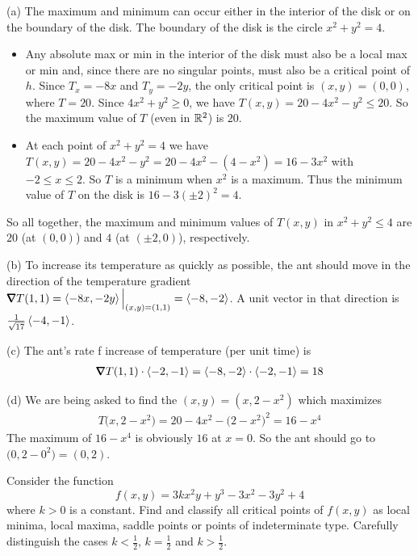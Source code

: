 \begin{solution}
(a)
The maximum and minimum can occur either in the interior
    of the disk or on the boundary of the disk. The boundary
    of the disk is the circle $x^2+y^2=4$.
\begin{itemize}
\item Any absolute max or min in the interior of the disk
      must also be a local max or min and, since there are no
      singular points, must also be a critical point of $h$.
      Since $T_x=-8x$ and $T_y=-2y$, the only critical point is
      $(x,y)=(0,0)$, where $T=20$.  Since $4x^2+y^2\ge 0$, 
      we have $T(x,y)=20-4x^2-y^2\le 20$. So the maximum value
      of $T$ (even in $\mathbb{R}^2$) is $20$.    

\item At each point of $x^2+y^2=4$ we have 
           $T(x,y)=20-4x^2-y^2=20 -4x^2-(4-x^2)=16-3x^2$ 
           with $-2\le x\le 2$. So $T$ is a minimum when $x^2$ is a maximum.
           Thus the minimum value of $T$ on the disk is $16-3(\pm 2)^2=4$. 
\end{itemize}
So all together, the maximum and minimum values of $T(x,y)$ in $x^2+y^2\le 4$
     are $20$ (at $(0,0)$) and  $4$ (at $(\pm 2,0)$), respectively.

(b) To increase its temperature as quickly as possible, the ant should
    move in the direction of the temperature gradient
    $\vnabla T(1,1)=\llt -8x,-2y\rgt\Big|_{(x,y)=(1,1)}=\llt -8,-2\rgt$.
    A unit vector in that direction is $\frac{1}{\sqrt{17}}\left< -4,-1\right>$. 

(c) The ant's rate f increase of temperature (per unit time) is
\begin{align*}
 \vnabla T(1,1)\cdot\llt -2,-1\rgt
=\llt -8,-2\rgt\cdot\llt -2,-1\rgt
=18
\end{align*}

(d) We are being asked to find the $(x,y)=(x,2-x^2)$ which maximizes
\begin{align*}
T\big(x,2-x^2\big) =20 -4x^2-\big(2-x^2\big)^2
                   = 16-x^4
\end{align*}
The maximum of $16-x^4$ is obviously $16$ at $x=0$. So the ant should
go to $\big(0,2-0^2\big)=(0,2)$.
\end{solution}


\begin{question}[M200 2014A] %
Consider the function
\begin{equation*}
f (x,y) = 3kx^2 y + y^3 - 3x^2 - 3y^2 + 4
\end{equation*}
where $k > 0$ is a constant. 
Find and classify all critical points of $f(x,y)$ as local minima,
local maxima, saddle points or points of indeterminate type. 
Carefully distinguish the cases $k < \frac{1}{2}$, $k = \frac{1}{2}$ 
and $k > \frac{1}{2}$.
\end{question}

